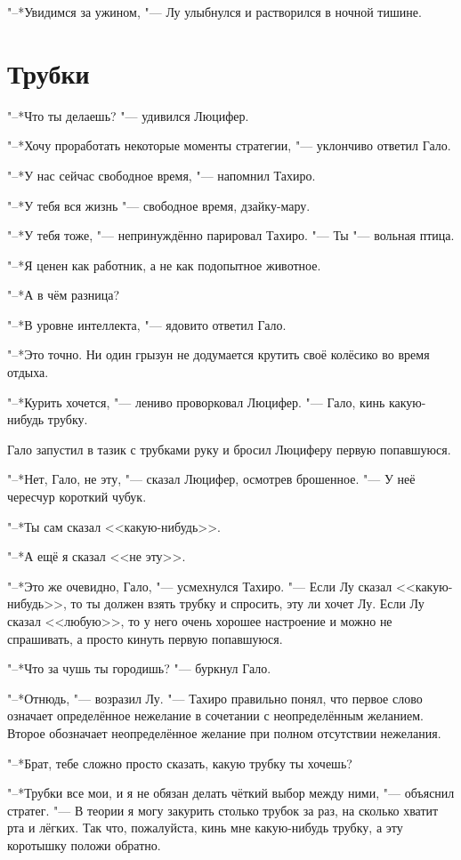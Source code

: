 \documentclass[a4paper,10pt]{book}
\begin{document}
"--*Увидимся за ужином, "--- Лу улыбнулся и растворился в ночной тишине.

\section{Трубки}

"--*Что ты делаешь? "--- удивился Люцифер.

"--*Хочу проработать некоторые моменты стратегии, "--- уклончиво ответил Гало.

"--*У нас сейчас свободное время, "--- напомнил Тахиро.

"--*У тебя вся жизнь "--- свободное время, дзайку-мару.

"--*У тебя тоже, "--- непринуждённо парировал Тахиро. "--- Ты "--- вольная птица.

"--*Я ценен как работник, а не как подопытное животное.

"--*А в чём разница?

"--*В уровне интеллекта, "--- ядовито ответил Гало.

"--*Это точно. Ни один грызун не додумается крутить своё колёсико во время отдыха.

"--*Курить хочется, "--- лениво проворковал Люцифер. "--- Гало, кинь какую-нибудь трубку.

Гало запустил в тазик с трубками руку и бросил Люциферу первую попавшуюся.

"--*Нет, Гало, не эту, "--- сказал Люцифер, осмотрев брошенное. "--- У неё чересчур короткий чубук.

"--*Ты сам сказал <<какую-нибудь>>.

"--*А ещё я сказал <<не эту>>.

"--*Это же очевидно, Гало, "--- усмехнулся Тахиро. "--- Если Лу сказал <<какую-нибудь>>, то ты должен взять трубку и спросить, эту ли хочет Лу. Если Лу сказал <<любую>>, то у него очень хорошее настроение и можно не спрашивать, а просто кинуть первую попавшуюся.

"--*Что за чушь ты городишь? "--- буркнул Гало.

"--*Отнюдь, "--- возразил Лу. "--- Тахиро правильно понял, что первое слово означает определённое нежелание в сочетании с неопределённым желанием. Второе обозначает неопределённое желание при полном отсутствии нежелания.

"--*Брат, тебе сложно просто сказать, какую трубку ты хочешь?

"--*Трубки все мои, и я не обязан делать чёткий выбор между ними, "--- объяснил стратег. "--- В теории я могу закурить столько трубок за раз, на сколько хватит рта и лёгких. Так что, пожалуйста, кинь мне какую-нибудь трубку, а эту коротышку положи обратно.
\end{document}
